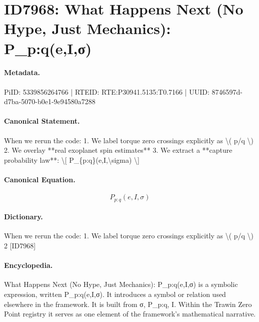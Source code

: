 \section*{ID7968: What Happens Next (No Hype, Just Mechanics): P\_p:q(e,I,σ)}
\paragraph{Metadata.}
PiID: 5339856264766 | RTEID: RTE:P30941.5135:T0.7166 | UUID: 8746597d-d7ba-5070-b0e1-9e94580a7288

\paragraph{Canonical Statement.}
When we rerun the code: 1. We label torque zero crossings explicitly as \textbackslash{}( p/q \textbackslash{}) 2. We overlay **real exoplanet spin estimates** 3. We extract a **capture probability law**: \textbackslash{}[ P\_\{p:q\}(e,I,\textbackslash{}sigma) \textbackslash{}]

\paragraph{Canonical Equation.}
\[
P_{p:q}(e,I,\sigma)
\]

\paragraph{Dictionary.}
When we rerun the code: 1. We label torque zero crossings explicitly as \textbackslash{}( p/q \textbackslash{}) 2 [ID7968]

\paragraph{Encyclopedia.}
What Happens Next (No Hype, Just Mechanics): P\_p:q(e,I,σ) is a symbolic expression, written P\_p:q(e,I,σ). It introduces a symbol or relation used elsewhere in the framework. It is built from σ, P\_p:q, I. Within the Trawin Zero Point registry it serves as one element of the framework's mathematical narrative.

